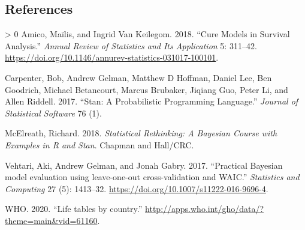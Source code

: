 \documentclass[
]{article}
\newlength{\cslhangindent}
\newenvironment{CSLReferences}[3] %
 {%
  \setlength{\parindent}{0pt}
  \ifodd #1 \everypar{\setlength{\hangindent}{\cslhangindent}}\ignorespaces\fi
  \ifnum #2 > 0
  \setlength{\parskip}{#2\baselineskip}
  \fi
 }%
 {}
\begin{document}
\newpage

\hypertarget{references}{%
\subsection*{References}\label{references}}

\hypertarget{refs}{}
\begin{CSLReferences}{1}{0}
\leavevmode\hypertarget{ref-Amico2018}{}%
Amico, Maïlis, and Ingrid Van Keilegom. 2018. {``{Cure Models in
Survival Analysis}.''} \emph{Annual Review of Statistics and Its
Application} 5: 311--42.
\url{https://doi.org/10.1146/annurev-statistics-031017-100101}.

\leavevmode\hypertarget{ref-carpenter2017stan}{}%
Carpenter, Bob, Andrew Gelman, Matthew D Hoffman, Daniel Lee, Ben
Goodrich, Michael Betancourt, Marcus Brubaker, Jiqiang Guo, Peter Li,
and Allen Riddell. 2017. {``Stan: A Probabilistic Programming
Language.''} \emph{Journal of Statistical Software} 76 (1).

\leavevmode\hypertarget{ref-McElreath2018}{}%
McElreath, Richard. 2018. \emph{{Statistical Rethinking: A Bayesian
Course with Examples in R and Stan}}. Chapman and Hall/CRC.

\leavevmode\hypertarget{ref-Vehtari2017}{}%
Vehtari, Aki, Andrew Gelman, and Jonah Gabry. 2017. {``{Practical
Bayesian model evaluation using leave-one-out cross-validation and
WAIC}.''} \emph{Statistics and Computing} 27 (5): 1413--32.
\url{https://doi.org/10.1007/s11222-016-9696-4}.

\leavevmode\hypertarget{ref-wholifetables}{}%
WHO. 2020. {``{Life tables by country}.''}
\url{http://apps.who.int/gho/data/?theme=main\&vid=61160}.

\end{CSLReferences}
\end{document}
